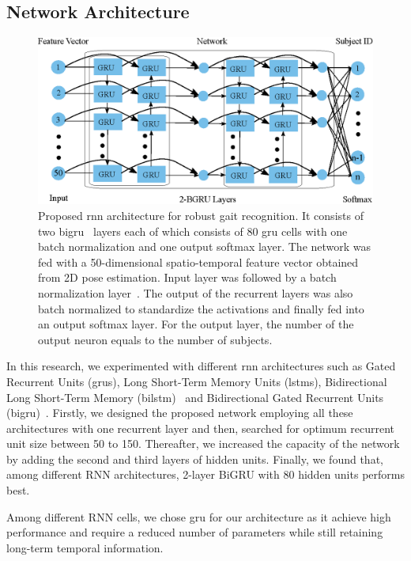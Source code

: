 \subsection{Network Architecture}
\begin{figure}
	\centering 
	\includegraphics[width = \textwidth]{figures/rnn_network.eps}
	
	\caption[Proposed RNN architecture for robust gait recognition]
	{Proposed \gls{rnn} architecture for robust gait recognition. It consists of two \gls{bigru}~\cite{Schuster_97} layers each of which consists of $ 80 $ \gls{gru} cells with one batch normalization and one output softmax layer. The network was fed with a 50-dimensional spatio-temporal feature vector obtained from 2D pose estimation. Input layer was followed by a batch normalization layer~\cite{Ioffe_15}. The output of the recurrent layers was also batch normalized to standardize the activations and finally fed into an output softmax layer. For the output layer, the number of the output neuron equals to the number of subjects. \label{fig:rnn_network}
    }
\end{figure}


In this research, we experimented with different \gls{rnn} architectures such as Gated Recurrent Units (\gls{gru}s),  Long Short-Term Memory Units (\gls{lstm}s), Bidirectional Long Short-Term Memory (\gls{bilstm})~\cite{Graves_05} and Bidirectional Gated Recurrent Units (\gls{bigru})~\cite{Schuster_97}. Firstly, we designed the proposed network employing all these architectures with one recurrent layer and then, searched for optimum recurrent unit size between 50 to 150. Thereafter, we increased the capacity of the network by adding the second and third layers of hidden units. Finally, we found that, among different RNN architectures, 2-layer BiGRU with 80 hidden units performs best. 

Among different RNN cells, we chose \gls{gru} for our architecture as it achieve high performance and require a reduced number of parameters while still retaining long-term temporal information.

